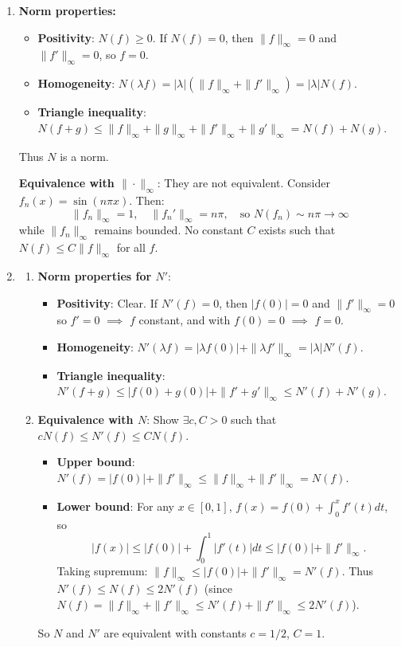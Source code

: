 \documentclass[12pt]{article}
\begin{document}
\begin{answerbox}
\begin{enumerate}
    \item \textbf{Norm properties:}
    \begin{itemize}
        \item \textbf{Positivity}: \(N(f) \geq 0\). If \(N(f)=0\), then \(\|f\|_\infty=0\) and \(\|f'\|_\infty=0\), so \(f=0\).
        \item \textbf{Homogeneity}: \(N(\lambda f) = |\lambda|(\|f\|_\infty + \|f'\|_\infty) = |\lambda|N(f)\).
        \item \textbf{Triangle inequality}: \(N(f+g) \leq \|f\|_\infty + \|g\|_\infty + \|f'\|_\infty + \|g'\|_\infty = N(f)+N(g)\).
    \end{itemize}
    Thus \(N\) is a norm.
    
    \textbf{Equivalence with \(\|\cdot\|_\infty\)}: They are not equivalent. Consider \(f_n(x) = \sin(n\pi x)\). Then:
    \[
    \|f_n\|_\infty = 1, \quad \|f_n'\|_\infty = n\pi, \quad \text{so } N(f_n) \sim n\pi \to \infty
    \]
    while \(\|f_n\|_\infty\) remains bounded. No constant \(C\) exists such that \(N(f) \leq C\|f\|_\infty\) for all \(f\).
    
    \item 
    \begin{enumerate}
        \item \textbf{Norm properties for \(N'\)}:
        \begin{itemize}
            \item \textbf{Positivity}: Clear. If \(N'(f)=0\), then \(|f(0)|=0\) and \(\|f'\|_\infty=0\) so \(f'=0\) $\implies$ \(f\) constant, and with \(f(0)=0\) $\implies$ \(f=0\).
            \item \textbf{Homogeneity}: \(N'(\lambda f) = |\lambda f(0)| + \|\lambda f'\|_\infty = |\lambda|N'(f)\).
            \item \textbf{Triangle inequality}: \(N'(f+g) \leq |f(0)+g(0)| + \|f'+g'\|_\infty \leq N'(f)+N'(g)\).
        \end{itemize}
        
        \item \textbf{Equivalence with \(N\)}: Show \(\exists c,C>0\) such that \(cN(f) \leq N'(f) \leq CN(f)\).
        \begin{itemize}
            \item \textbf{Upper bound}: \(N'(f) = |f(0)| + \|f'\|_\infty \leq \|f\|_\infty + \|f'\|_\infty = N(f)\).
            \item \textbf{Lower bound}: For any \(x\in[0,1]\), \(f(x) = f(0) + \int_0^x f'(t)dt\), so
            \[
            |f(x)| \leq |f(0)| + \int_0^1 |f'(t)|dt \leq |f(0)| + \|f'\|_\infty.
            \]
            Taking supremum: \(\|f\|_\infty \leq |f(0)| + \|f'\|_\infty = N'(f)\).
            Thus \(N'(f) \leq N(f) \leq 2N'(f)\) (since \(N(f) = \|f\|_\infty + \|f'\|_\infty \leq N'(f) + \|f'\|_\infty \leq 2N'(f)\)).
        \end{itemize}
        So \(N\) and \(N'\) are equivalent with constants \(c=1/2\), \(C=1\).
    \end{enumerate}
\end{enumerate}
\end{answerbox}
\end{document}
